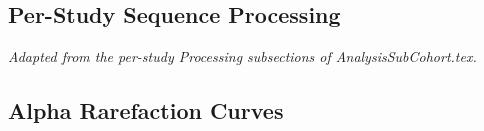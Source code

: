\documentclass[11pt,a4paper]{article}
\newcommand{\placeholder}[1]{\par\medskip\noindent\colorbox{gray!15}{\parbox{\dimexpr\linewidth-2\fboxsep}{%
  \small\textit{#1}}}\par\medskip}
\begin{document}
\subsection{Per-Study Sequence Processing}\label{sup:processing} \placeholder{Adapted from the per-study Processing subsections of AnalysisSubCohort.tex.}
\subsection{Alpha Rarefaction Curves}\label{sup:rarefaction} \placeholder{}
\end{document}
